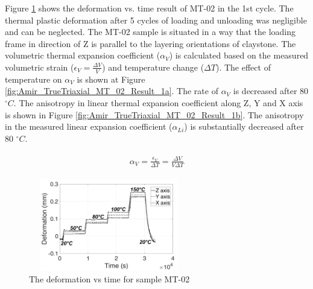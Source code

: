 Figure \ref{fig:Amir_TrueTriaxial_MT_02_Result} shows the deformation vs. time result of MT-02 in the 1st cycle. The thermal plastic deformation after 5 cycles of loading and unloading was negligible and can be neglected. The MT-02 sample is situated in a way that the loading frame in direction of Z is parallel to the layering orientations of claystone. The volumetric thermal expansion coefficient ($\alpha_V$) is calculated based on the measured volumetric strain ($\epsilon_V=\frac{\Delta V}{V}$) and temperature change ($\Delta T$). The effect of temperature on $\alpha_V$ is shown at Figure \ref{fig:Amir_TrueTriaxial_MT_02_Result_1a}. The rate of $\alpha_V$ is decreased after 80 $^{\circ}C$. The anisotropy in linear thermal expansion coefficient along Z, Y and X axis is shown in Figure \ref{fig:Amir_TrueTriaxial_MT_02_Result_1b}. The anisotropy in the measured linear expansion coefficient ($\alpha_{Li}$) is substantially decreased after 80 $^{\circ}C$.

\begin{align}
\label{eq:ThermalExpansion}
\begin{split}
\alpha_V=\frac{\epsilon_V}{\Delta T}=\frac{\Delta V}{V\Delta T}
\end{split}
\end{align}

\begin{figure}[!ht]
\centering
\includegraphics[width=7cm,height=4cm]{figures/Amir_TrueTriaxial_MT_02_Result.png}
\caption{The deformation vs time for sample MT-02}
\label{fig:Amir_TrueTriaxial_MT_02_Result}
\end{figure} 


